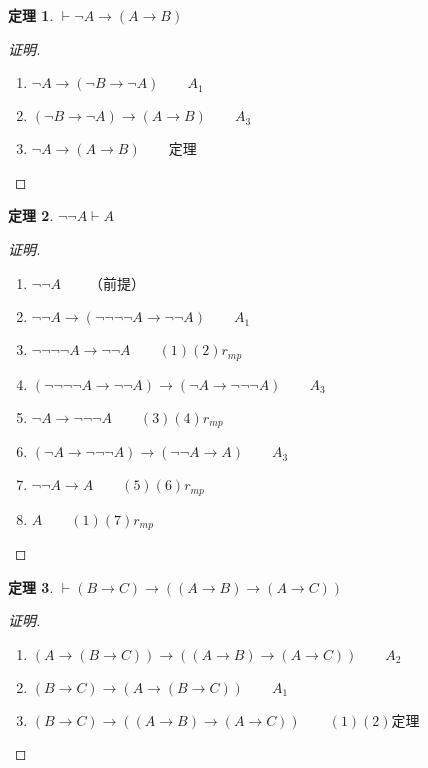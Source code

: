 \documentclass{article}
\newtheorem{Thm}{定理}
\begin{document}
\begin{CJK*}{UTF8}{gbsn}
  \begin{Thm}$\vdash \lnot A\to (A\to B)$
  \end{Thm}
  \begin{proof}[证明]$\quad$
    \begin{enumerate}
      \item $ \lnot A \to (\lnot B \to \lnot A) \quad\quad A_1$ 
      \item $ (\lnot B \to \lnot A)\to (A\to B)\quad\quad A_3$
      \item  $\lnot A \to (A\to B)\qquad$定理 
    \end{enumerate}
  \end{proof}

  \begin{Thm}$\lnot \lnot A\vdash A$\end{Thm}
  \begin{proof}[证明]$\quad$
    \begin{enumerate}
      \item $\lnot \lnot A\qquad$（前提）
      \item $\lnot \lnot A\to (\lnot \lnot \lnot \lnot A \to \lnot \lnot A)\qquad A_1$
      \item $\lnot \lnot \lnot \lnot A \to \lnot \lnot A\qquad (1)(2)r_{mp}$
      \item $(\lnot \lnot \lnot \lnot A \to \lnot \lnot A) \to ( \lnot A \to \lnot \lnot \lnot A) \quad \quad A_3$
      \item $ \lnot A \to \lnot \lnot \lnot A \quad\quad (3)(4)r_{mp}$
      \item  $( \lnot A \to \lnot \lnot \lnot A)\to (\lnot \lnot A \to A) \quad \quad A_3$
      \item $\lnot \lnot A \to A \quad\quad (5)(6)r_{mp}$
      \item $A\qquad(1)(7)r_{mp}$
    \end{enumerate}
  \end{proof}

  \begin{Thm}$\vdash(B\to C)\to ((A\to B)\to (A\to C))$\end{Thm}
  \begin{proof}[证明]$\quad$
    \begin{enumerate}
      \item $(A\to (B\to C)) \to ((A\to B)\to (A\to C)) \quad\quad A_2$
      \item $(B\to C) \to (A\to (B\to C)) \quad\quad A_1$
      \item $(B\to C)\to ((A\to B)\to (A\to C))\qquad (1)(2)\text{定理}$
    \end{enumerate}
  \end{proof}


\end{CJK*}
\end{document}
